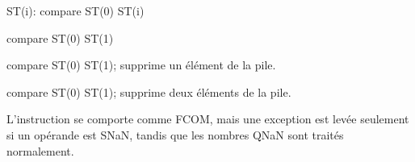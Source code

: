   \item[FUCOM] ST(i): compare ST(0) \AndENRU ST(i)
  \item[FUCOM] compare ST(0) \AndENRU ST(1)
  \item[FUCOMP] compare ST(0) \AndENRU ST(1); supprime un élément de la pile.
  \item[FUCOMPP] compare ST(0) \AndENRU ST(1); supprime deux éléments de la pile.

  L'instruction se comporte comme FCOM, mais une exception est levée seulement si
  un opérande est SNaN, tandis que les nombres QNaN sont traités normalement.
